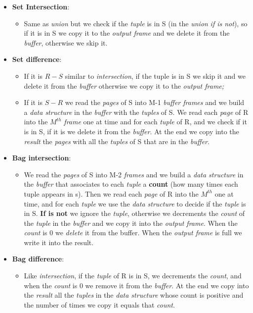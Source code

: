 \documentclass{article}
\begin{document}
\begin{itemize}
\begin{itemize}
\end{itemize}
\item \textbf{Set Intersection}:
\begin{itemize}
\item Same as \emph{union} but we check if the \emph{tuple} is in S (in the \emph{union} \emph{if is not}), so if it is in S we copy it to the \emph{output frame} and we delete it from the \emph{buffer}, otherwise we skip it.  
\end{itemize}
\item \textbf{Set difference}:
\begin{itemize}
\item If it is $R-S$ similar to \emph{intersection}, if the tuple is in S we skip it and we delete it from the \emph{buffer} otherwise we copy it to the \emph{output frame;}
\item If it is $S-R$ we read the \emph{pages} of S into M-1 \emph{buffer frames} and we build a \emph{data structure} in the \emph{buffer} with the \emph{tuples} of S. We read each \emph{page} of R into the $M^{th}$ \emph{frame} one at time and for each \emph{tuple} of R, and we check if it is in S, if it is we delete it from the \emph{buffer}. At the end we copy into the \emph{result} the \emph{pages} with all the \emph{tuples} of S that are in the \emph{buffer}. 
\end{itemize}
\item \textbf{Bag intersection}:
\begin{itemize}
\item We read the \emph{pages} of S into M-2 \emph{frames} and we build a \emph{data structure} in the \emph{buffer} that associates to each \emph{tuple} a \textbf{count} (how many times each tuple appears in s). Then we read each \emph{page} of R into the $M^{th}$ one at time, and for each \emph{tuple} we use the \emph{data structure} to decide if the \emph{tuple} is in S. \textbf{If is not} we ignore the \emph{tuple}, otherwise we decrements the \emph{count} of the \emph{tuple} in the \emph{buffer} and we copy it into the \emph{output frame}. When the \emph{count} is 0 we \emph{delete} it from the buffer. When the \emph{output frame} is full we write it into the result. 
\end{itemize}
\item \textbf{Bag difference}:
\begin{itemize}
\item Like \emph{intersection}, if the \emph{tuple} of R is in S, we decrements the \emph{count}, and when the \emph{count} is 0 we remove it from the \emph{buffer}. At the end we copy into the \emph{result} all the \emph{tuples} in the \emph{data structure} whose count is positive and the number of times we copy it equals that \emph{count}. 

\end{itemize}
\end{itemize}
\end{document}
